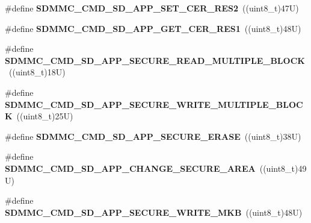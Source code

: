 \begin{DoxyCompactItemize}
\#define {\bfseries S\+D\+M\+M\+C\+\_\+\+C\+M\+D\+\_\+\+S\+D\+\_\+\+A\+P\+P\+\_\+\+S\+E\+T\+\_\+\+C\+E\+R\+\_\+\+R\+E\+S2}~((uint8\+\_\+t)47\+U)
\item 
\mbox{\label{group___s_d_m_m_c___l_l___exported___constants_ga69235b7a5213694f923a1663f937f119}} 
\#define {\bfseries S\+D\+M\+M\+C\+\_\+\+C\+M\+D\+\_\+\+S\+D\+\_\+\+A\+P\+P\+\_\+\+G\+E\+T\+\_\+\+C\+E\+R\+\_\+\+R\+E\+S1}~((uint8\+\_\+t)48\+U)
\item 
\mbox{\label{group___s_d_m_m_c___l_l___exported___constants_ga36725a87e8a8ab686d4d23882836ee0a}} 
\#define {\bfseries S\+D\+M\+M\+C\+\_\+\+C\+M\+D\+\_\+\+S\+D\+\_\+\+A\+P\+P\+\_\+\+S\+E\+C\+U\+R\+E\+\_\+\+R\+E\+A\+D\+\_\+\+M\+U\+L\+T\+I\+P\+L\+E\+\_\+\+B\+L\+O\+CK}~((uint8\+\_\+t)18\+U)
\item 
\mbox{\label{group___s_d_m_m_c___l_l___exported___constants_ga3edb3dd07b11b6feb0d95877f8486864}} 
\#define {\bfseries S\+D\+M\+M\+C\+\_\+\+C\+M\+D\+\_\+\+S\+D\+\_\+\+A\+P\+P\+\_\+\+S\+E\+C\+U\+R\+E\+\_\+\+W\+R\+I\+T\+E\+\_\+\+M\+U\+L\+T\+I\+P\+L\+E\+\_\+\+B\+L\+O\+CK}~((uint8\+\_\+t)25\+U)
\item 
\mbox{\label{group___s_d_m_m_c___l_l___exported___constants_gaed4b204ed38f97dbdd4957cdcffdbdb8}} 
\#define {\bfseries S\+D\+M\+M\+C\+\_\+\+C\+M\+D\+\_\+\+S\+D\+\_\+\+A\+P\+P\+\_\+\+S\+E\+C\+U\+R\+E\+\_\+\+E\+R\+A\+SE}~((uint8\+\_\+t)38\+U)
\item 
\mbox{\label{group___s_d_m_m_c___l_l___exported___constants_ga0f847007a99453245d3ce7218a749959}} 
\#define {\bfseries S\+D\+M\+M\+C\+\_\+\+C\+M\+D\+\_\+\+S\+D\+\_\+\+A\+P\+P\+\_\+\+C\+H\+A\+N\+G\+E\+\_\+\+S\+E\+C\+U\+R\+E\+\_\+\+A\+R\+EA}~((uint8\+\_\+t)49\+U)
\item 
\mbox{\label{group___s_d_m_m_c___l_l___exported___constants_ga3afc89e73bc5888b63f4682fdc1cebfe}} 
\#define {\bfseries S\+D\+M\+M\+C\+\_\+\+C\+M\+D\+\_\+\+S\+D\+\_\+\+A\+P\+P\+\_\+\+S\+E\+C\+U\+R\+E\+\_\+\+W\+R\+I\+T\+E\+\_\+\+M\+KB}~((uint8\+\_\+t)48\+U)
\item 

\end{DoxyCompactItemize}
